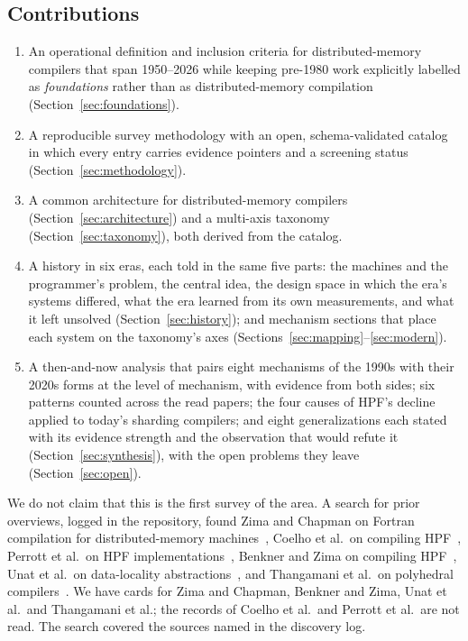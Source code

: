 \subsection{Contributions}
\begin{enumerate}[leftmargin=*,nosep]
  \item An operational definition and inclusion criteria for distributed-memory compilers that span 1950--2026 while keeping pre-1980 work explicitly labelled as \emph{foundations} rather than as distributed-memory compilation (Section~\ref{sec:foundations}).
  \item A reproducible survey methodology with an open, schema-validated catalog in which every entry carries evidence pointers and a screening status (Section~\ref{sec:methodology}).
  \item A common architecture for distributed-memory compilers (Section~\ref{sec:architecture}) and a multi-axis taxonomy (Section~\ref{sec:taxonomy}), both derived from the catalog.
  \item A history in six eras, each told in the same five parts: the machines and the programmer's problem, the central idea, the design space in which the era's systems differed, what the era learned from its own measurements, and what it left unsolved (Section~\ref{sec:history}); and mechanism sections that place each system on the taxonomy's axes (Sections~\ref{sec:mapping}--\ref{sec:modern}).
  \item A then-and-now analysis that pairs eight mechanisms of the 1990s with their 2020s forms at the level of mechanism, with evidence from both sides; six patterns counted across the read papers; the four causes of HPF's decline applied to today's sharding compilers; and eight generalizations each stated with its evidence strength and the observation that would refute it (Section~\ref{sec:synthesis}), with the open problems they leave (Section~\ref{sec:open}).
\end{enumerate}
We do not claim that this is the first survey of the area. A search for prior overviews, logged in the repository, found Zima and Chapman on Fortran compilation for distributed-memory machines~\cite{zima1993compiling}, Coelho et al.\ on compiling HPF~\cite{coelho1996hpf}, Perrott et al.\ on HPF implementations~\cite{perrott1997hpf}, Benkner and Zima on compiling HPF~\cite{benkner1999compiling}, Unat et al.\ on data-locality abstractions~\cite{unat2017trends}, and Thangamani et al.\ on polyhedral compilers~\cite{thangamani2024polyhedral}. We have cards for Zima and Chapman, Benkner and Zima, Unat et al.\ and Thangamani et al.; the records of Coelho et al.\ and Perrott et al.\ are not read. The search covered the sources named in the discovery log.
